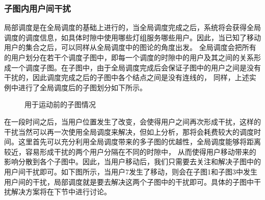 \subsubsection{子图内用户间干扰}
局部调度是在全局调度的基础上进行的，当全局调度完成之后，系统将会获得全局调度的调度信息，如具体时隙中使用哪些灯组服务哪些用户。因此，当已知了移动用户的集合之后，可以同样从全局调度中的图论的角度出发。
全局调度会把所有的用户划分在若干个调度子图中，即每一个调度的时隙中的用户及其之间的关系形成一个调度子图。在子图中，由于全局调度完成后会保证子图中的用户之间是没有干扰的，因此调度完成之后的子图中各个结点之间是没有连线的，
同样，上述实例中进行了全局调度后的子图划分如下所示。

\begin{figure}[htbp]
    \centering
    \caption{用于运动前的子图情况}
    \label{fig:slot-before-user-move}
\end{figure}

在一段时间之后，当用户位置发生了改变，会使得用户之间再次形成干扰，这样的干扰当然可以再一次使用全局调度来解决，但如上分析，那将会耗费较大的调度时间。这里首先可以充分利用全局调度带来的多子图的优越性，全局调度能够将距离较近，容易形成干扰的两个用户分隔在不同的时隙中，
从而使得用户移动带来的影响分散到各个子图中。因此，当用户移动后，我们只需要去关注和解决子图中的用户间干扰即可。如下图所示，当用户7发生了移动，则会在子图1和子图3中发生用户间的干扰，局部调度就是要去解决这两个子图中的干扰即可。具体的子图中干扰解决方案将在下节中进行讨论。

